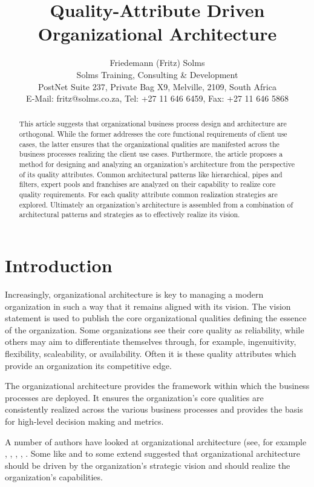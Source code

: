 \documentclass[11pt,english,a4]{article}
\title{Quality-Attribute Driven Organizational Architecture}
\author{Friedemann (Fritz) Solms \\ Solms Training, Consulting \& Development \\
        PostNet Suite 237, Private Bag X9, Melville, 2109, South Africa \\
				E-Mail: fritz@solms.co.za, Tel: +27 11 646 6459, Fax: +27 11 646 5868}
\begin{document}
\maketitle

\begin{abstract}
	This article suggests that organizational business process design and architecture are orthogonal. While the former addresses the core functional requirements of client use cases, the latter ensures that the organizational qualities are manifested across the business processes realizing the client use cases. Furthermore, the article proposes a method for designing and analyzing an organization's architecture from the perspective of its quality attributes.  Common architectural patterns like hierarchical, pipes and filters, expert pools and franchises are analyzed on their capability to realize core quality requirements. For each quality attribute common realization strategies are explored. Ultimately an organization's architecture is assembled from a combination of architectural patterns and strategies as to effectively realize its vision. 
\end{abstract}

\section{Introduction}

Increasingly, organizational architecture is key to managing a modern organization in such a way that it remains aligned with its vision. The vision statement is used to publish the core organizational qualities defining the essence of the organization. Some organizations see their core quality as reliability, while others may aim to differentiate themselves through, for example, ingenuitivity, flexibility, scaleability, or availability. Often it is these quality attributes which provide an organization its competitive edge.

The organizational architecture provides the framework within which the business processes are deployed. It ensures the organization's core qualities are consistently realized across the various business processes and provides the basis for high-level decision making and metrics.

A number of authors have looked at organizational architecture (see, for example
 \cite{Ashmore-Henson-Chancellor-Nelson-2004},
 \cite{Brickley-Smith-Zimmermann-2001},
 \cite{Nadler-Gerstein-Shaw-1992},
 \cite{Galbraith-Downy-Kates-2001},
 \cite{Ethiraj-Levinthal-2004}. Some like \cite{King-1995} and to some extend \cite{Ashmore-Henson-Chancellor-Nelson-2004} suggested that organizational architecture should be driven by the organization's strategic vision and should realize the organization's capabilities.
\end{document}
